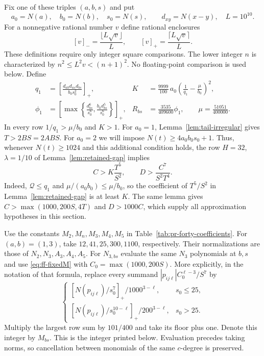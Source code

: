 \documentclass[12pt]{article}
\numberwithin{equation}{section}
\begin{document}
Fix one of these triples $(a,b,s)$ and put
\[
 a_0=N(a),\quad b_0=N(b),\quad s_0=N(s),\qquad
 d_{xy}=N(x-y),\quad L=10^{10}.
\]
For a nonnegative rational number $v$ define rational enclosures
\[
 [v]_- =\frac{\lfloor L\sqrt v\rfloor}{L},\qquad
 [v]_+ =\frac{\lceil L\sqrt v\rceil}{L}.
\]
These definitions require only integer square comparisons. The lower
integer $n$ is characterized by $n^2\le L^2v<(n+1)^2$.
No floating-point comparison is used below. Define
\begin{align*}
 q_1&=\left[\frac{d_{ab}d_{as}d_{bs}}{b_0s_0^2}\right]_+,
 &K&=\frac{9999}{100}\,a_0
       \left(\frac1{q_1}-\frac{\mu}{b_0}\right)^2,\\
 \phi_1&=\left[\max\left\{\frac{d_{bs}^6}{s_0^6},
                  \frac{b_0d_{bs}^5}{s_0^6}\right\}\right]_+,
 &R_{bs}&=\frac{3535}{409600}\phi_1,
 \qquad \mu=\frac{51051}{400000}.
\end{align*}
In every row $1/q_1>\mu/b_0$ and $K>1$.
For $a_0=1$, Lemma~\ref{lem:tail-irregular} gives $T>2BS=2ABS$.
For $a_0=2$ we will impose $N(t)\ge4a_0b_0s_0+1$.
Thus, whenever $N(t)\ge1024$ and this additional condition holds,
the row $H=32$, $\lambda=1/10$ of Lemma~\ref{lem:retained-gap}
implies
\begin{equation}\label{eq:fixed56-gap}
 C>K\frac{T^5}{S^2},\qquad
 D>\frac{C^7}{S^2T^4}.
\end{equation}
Indeed, $\mathcal Q\le q_1$ and $\mu/(a_0b_0)\le\mu/b_0$,
so the coefficient of $T^5/S^2$ in Lemma~\ref{lem:retained-gap}
is at least $K$.
The same lemma gives $C>\max(1000,200S,4T)$ and $D>1000C$,
which supply all approximation hypotheses in this section.

Use the constants $M_2,M_n,M_3,M_4,M_5$ in
Table~\ref{tab:pr-forty-coefficients}. For $(a,b)=(1,3)$, take
$12,41,25,300,1100$, respectively. Their normalizations are those of
$N_2,N_3,A_3,A_4,A_5$.
For $N_{3,bs}$ evaluate the same $N_3$ polynomials at $b,s$ and use
\eqref{eq:ff-fixedM} with $C_0=\max(1000,200S)$.
More explicitly, in the notation of that formula, replace every
summand $|p_{ij\ell}|C_0^{\ell-3}/S^7$ by
\[
 \begin{cases}
 [N(p_{ij\ell})/s_0^7]_+/1000^{3-\ell},&s_0\le25,\\
 [N(p_{ij\ell})/s_0^{10-\ell}]_+/200^{3-\ell},&s_0>25.
 \end{cases}
\]
Multiply the largest row sum by $101/400$ and take its floor plus one.
Denote this integer by $M_{bs}$.
This is the integer printed below. Evaluation precedes taking norms,
so cancellation between monomials of the same $c$-degree is preserved.
\end{document}
